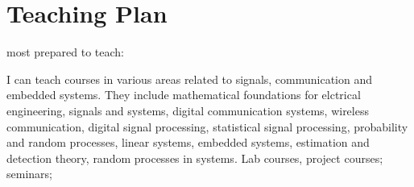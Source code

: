 \documentclass[10pt]{article}
\begin{document}
\section{Teaching Plan}
most prepared to teach:

I can teach courses in various areas related to signals, communication and embedded systems. They include mathematical foundations for elctrical engineering, signals and systems, digital communication systems, wireless communication, digital signal processing, statistical signal processing, probability and random processes, linear systems, embedded systems, estimation and detection theory, random processes in systems. 
Lab courses, project courses;
seminars;





\end{document}
